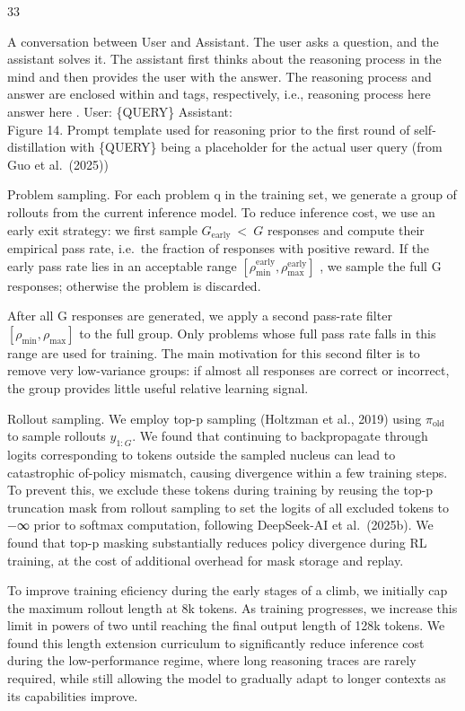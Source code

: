 \documentclass[
  10
]{article}
\begin{document}
33

A conversation between User and Assistant. The user asks a question, and
the assistant solves it. The assistant first thinks about the reasoning
process in the mind and then provides the user with the answer. The
reasoning process and answer are enclosed within and tags, respectively,
i.e., reasoning process here answer here . User: \{QUERY\} Assistant: \\
Figure 14. Prompt template used for reasoning prior to the first round
of self-distillation with \{QUERY\} being a placeholder for the actual
user query (from Guo et al.~(2025))

Problem sampling. For each problem q in the training set, we generate a
group of rollouts from the current inference model. To reduce inference
cost, we use an early exit strategy: we first sample
\(G _ { \mathrm { e a r l y } } \ < \ G\) responses and compute their
empirical pass rate, i.e.~the fraction of responses with positive
reward. If the early pass rate lies in an acceptable range
\([ \rho _ { \mathrm { m i n } } ^ { \mathrm { e a r l y } } , \rho _ { \mathrm { m a x } } ^ { \mathrm { e a r l y } } ]\)
, we sample the full G responses; otherwise the problem is discarded.

After all G responses are generated, we apply a second pass-rate filter
\([ \rho _ { \mathrm { m i n } } , \rho _ { \mathrm { m a x } } ]\) to
the full group. Only problems whose full pass rate falls in this range
are used for training. The main motivation for this second filter is to
remove very low-variance groups: if almost all responses are correct or
incorrect, the group provides little useful relative learning signal.

Rollout sampling. We employ top-p sampling (Holtzman et al., 2019) using
\(\pi _ { \mathrm { o l d } }\) to sample rollouts \(y _ { 1 : G } .\)
We found that continuing to backpropagate through logits corresponding
to tokens outside the sampled nucleus can lead to catastrophic of-policy
mismatch, causing divergence within a few training steps. To prevent
this, we exclude these tokens during training by reusing the top-p
truncation mask from rollout sampling to set the logits of all excluded
tokens to −∞ prior to softmax computation, following DeepSeek-AI et
al.~(2025b). We found that top-p masking substantially reduces policy
divergence during RL training, at the cost of additional overhead for
mask storage and replay.

To improve training eficiency during the early stages of a climb, we
initially cap the maximum rollout length at 8k tokens. As training
progresses, we increase this limit in powers of two until reaching the
final output length of 128k tokens. We found this length extension
curriculum to significantly reduce inference cost during the
low-performance regime, where long reasoning traces are rarely required,
while still allowing the model to gradually adapt to longer contexts as
its capabilities improve.
\end{document}
